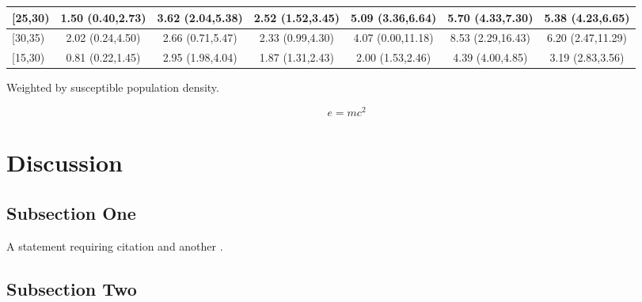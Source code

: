 \documentclass[a4paper,10pt,british]{article} %
\begin{document}
\begin{table}[!ht]
\begin{adjustwidth}{-20mm}{0mm}
\begin{tabular}{|l|c|c|c|c|c|c|}
[25,30)                               & 1.50 (0.40,2.73)    & 3.62 (2.04,5.38)    & 2.52 (1.52,3.45)    & 5.09 (3.36,6.64)    & 5.70 (4.33,7.30)    & 5.38 (4.23,6.65) \\ \hline
[30,35)                               & 2.02 (0.24,4.50)    & 2.66 (0.71,5.47)    & 2.33 (0.99,4.30)    & 4.07 (0.00,11.18)   & 8.53 (2.29,16.43)   & 6.20 (2.47,11.29) \\ \hline
[15,30)                               & 0.81 (0.22,1.45)    & 2.95 (1.98,4.04)    & 1.87 (1.31,2.43)    & 2.00 (1.53,2.46)    & 4.39 (4.00,4.85)    & 3.19 (2.83,3.56) \\ \hline
\end{tabular}
\begin{flushleft} Weighted by susceptible population density.
\end{flushleft}
\label{table1}
\end{adjustwidth}
\end{table}

\blindtext %

\begin{equation}
\label{eq:emc}
e = mc^2
\end{equation}

\blindtext %


\section{Discussion}

\subsection{Subsection One}

A statement requiring citation \cite{Schlegel2016} and another \cite{Williams2001}.

\blindtext %

\subsection{Subsection Two}

\blindtext %








\end{document}
